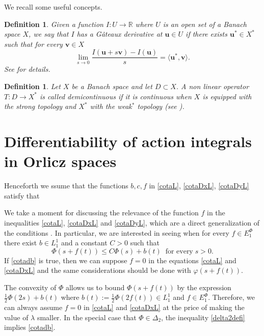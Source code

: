 \documentclass[twoside]{elsarticle}
\newtheorem{defi}[thm]{Definition}
\theoremstyle{remark}
\newcommand{\ephi}{E^{\Phi}}
\renewcommand{\b}[1]{\boldsymbol{#1}}
\renewcommand{\leq}{\leqslant}
\begin{document}
  We recall some useful concepts.

	\begin{defi} 
	Given a function $I:U\to\mathbb{R}$ where $U$ is an open set of a Banach space $X$,
we say that $I$ has a G\^ateaux derivative at $\b{u} \in U$ if there exists $\b{u}^*\in X^*$ such that for every $\b{v} \in X$
\[
\lim_{s \rightarrow 0}\frac{I(\b{u}+s\b{v})-I(\b{u}) }{s}=\langle \b{u}^* , \b{v}\rangle.
\]
See \cite{ambrosetti} for details. 
\end{defi}

\begin{defi} Let $X$ be a Banach space and let $D\subset X$. A non linear operator $T:D\to X^*$ is called \emph{demicontinuous} if it is continuous when $X$ is equipped with the strong topology and $X^*$ with the weak${}^*$ topology 
(see \cite{kato1964demicontinuity}).
\end{defi} 

\section{Differentiability of action integrals in Orlicz spaces}\label{sec:dif}


Henceforth we ssume that the functions $b,c,f$ in \eqref{cotaL}, \eqref{cotaDxL}, \eqref{cotaDyL} satisfy that 



We take a moment for  discussing the relevance of the function $f$ in the inequalities \eqref{cotaL},  \eqref{cotaDxL} and \eqref{cotaDyL}, which are a direct  generalization of the conditions \cite[Eq (a), p. 10]{mawhin2010critical}.  In particular, we are interested in seeing when for every  $f\in \ephi_1$ there exist
$b\in L^1_1$ and a constant $C>0$ such that 
\begin{equation}\label{cotadb}
\Phi(s+f(t))\leq C\Phi(s)+b(t)\;\;\mbox{for every}\;s>0.
\end{equation} 
If \eqref{cotadb} is true, then we can suppose $f=0$  in the equations \eqref{cotaL} and \eqref{cotaDxL} and the same considerations should be done with $\varphi\left(s+f(t)\right)$.

 The convexity of $\Phi$ allows us to bound  $\Phi(s+f(t))$ by the expression  $\frac12\Phi(2s)+b(t)$ where $b(t):=\tfrac12\Phi(2f(t))\in L^1_1$ and $f\in \ephi_1$. Therefore, we can always assume $f = 0$ in \eqref{cotaL} and \eqref{cotaDxL} at the price of making  the value of $\lambda$ smaller. In the special case that $\Phi\in\Delta_2$, the inequality \eqref{delta2defi} implies \eqref{cotadb}. 
\end{document}
